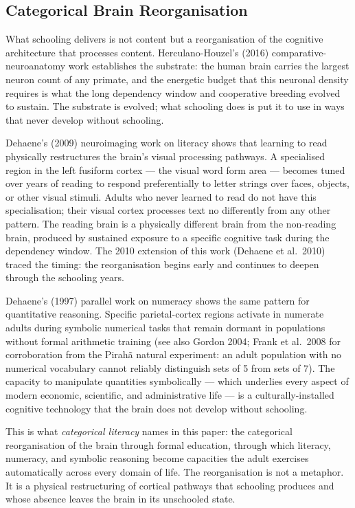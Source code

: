 \documentclass[12pt,letterpaper]{article}
\begin{document}
\subsection{Categorical Brain Reorganisation}\label{categorical-brain-reorganisation}

What schooling delivers is not content but a reorganisation of the
cognitive architecture that processes content. Herculano-Houzel's
(2016) comparative-neuroanatomy work establishes the substrate: the
human brain carries the largest neuron count of any primate, and the
energetic budget that this neuronal density requires is what the long
dependency window and cooperative breeding evolved to sustain. The
substrate is evolved; what schooling does is put it to use in ways
that never develop without schooling.

Dehaene's (2009) neuroimaging work on literacy shows that learning
to read physically restructures the brain's visual processing
pathways. A specialised region in the left fusiform cortex --- the
visual word form area --- becomes tuned over years of reading to
respond preferentially to letter strings over faces, objects, or
other visual stimuli. Adults who never learned to read do not have
this specialisation; their visual cortex processes text no
differently from any other pattern. The reading brain is a physically
different brain from the non-reading brain, produced by sustained
exposure to a specific cognitive task during the dependency window.
The 2010 extension of this work (Dehaene et al.\ 2010) traced the
timing: the reorganisation begins early and continues to deepen
through the schooling years.

Dehaene's (1997) parallel work on numeracy shows the same pattern for
quantitative reasoning. Specific parietal-cortex regions activate in
numerate adults during symbolic numerical tasks that remain dormant
in populations without formal arithmetic training (see also Gordon
2004; Frank et al.\ 2008 for corroboration from the Pirahã natural
experiment: an adult population with no numerical vocabulary cannot
reliably distinguish sets of 5 from sets of 7). The capacity to
manipulate quantities symbolically --- which underlies every aspect
of modern economic, scientific, and administrative life --- is a
culturally-installed cognitive technology that the brain does not
develop without schooling.

This is what \emph{categorical literacy} names in this paper: the
categorical reorganisation of the brain through formal education,
through which literacy, numeracy, and symbolic reasoning become
capacities the adult exercises automatically across every domain of
life. The reorganisation is not a metaphor. It is a physical
restructuring of cortical pathways that schooling produces and whose
absence leaves the brain in its unschooled state.
\end{document}

